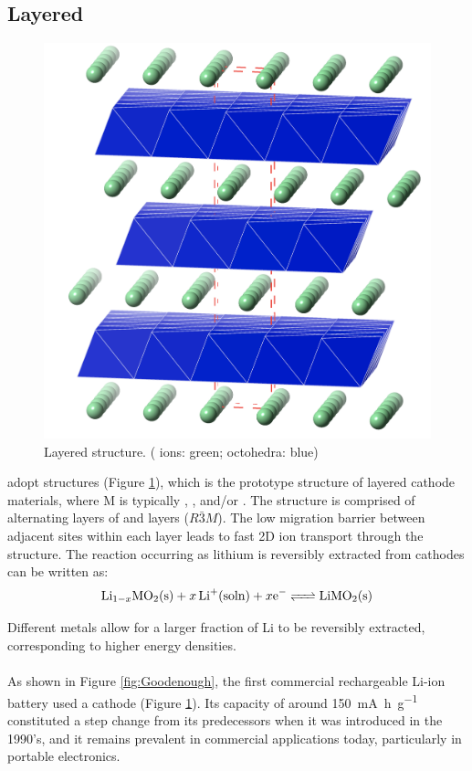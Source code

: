 \subsection{Layered }
\begin{figure}
\centering
\includegraphics[height=0.6\linewidth]{figures/structures/LiCoO2}
\caption[Layered  structure]{Layered  structure. ( ions: green;  octohedra: blue)\\ }
\label{fig:LCO}
\end{figure}
 adopt  structures (Figure \ref{fig:LCO}), which is the prototype structure of  layered cathode materials, where M is typically , , and/or .
The structure is comprised of alternating layers of \ce{[MO2]-} and  layers ($R\bar{3}M$).\cite{Islam2014}
The low migration barrier between adjacent  sites within each layer leads to fast 2D ion transport through the structure.\cite{Ellis2010a}
The reaction occurring as lithium is reversibly extracted from  cathodes can be written as:\cite{Islam2014}
\begin{equation}
\ce{Li_{1-x}MO2(s) +$x$Li+(soln) +$x$e- <=> LiMO2(s)}
\end{equation}

Different metals allow for a larger fraction of Li to be reversibly extracted, corresponding to higher energy densities.

\paragraph{}
As shown in Figure \ref{fig:Goodenough}, the first commercial rechargeable Li-ion battery used a  cathode (Figure \ref{fig:LCO}).
Its capacity of around \SI{150}{\milli\ampere\hour\per\gram} constituted a step change from its predecessors when it was introduced in the 1990's, and it remains prevalent in commercial applications today, particularly in portable electronics.\cite{Goodenough2013}

